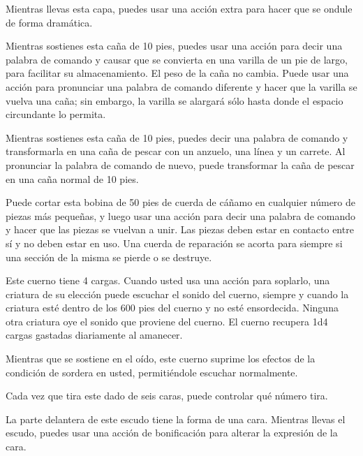 \documentclass[a4paper,twocolumn,openany,10pt]{dndbook}
\begin{document}
Mientras llevas esta capa, puedes usar una acción extra para hacer que se ondule de forma dramática.

Mientras sostienes esta caña de 10 pies, puedes usar una acción para decir una palabra de comando y causar que se convierta en
una varilla de un pie de largo, para facilitar su almacenamiento. El peso de la caña no cambia. Puede usar una acción para
pronunciar una palabra de comando diferente y hacer que la varilla se vuelva una caña; sin embargo, la varilla se alargará sólo
hasta donde el espacio circundante lo permita. 

Mientras sostienes esta caña de 10 pies, puedes decir una palabra de comando y transformarla en una caña de pescar con un
anzuelo, una línea y un carrete. Al pronunciar la palabra de comando de nuevo, puede transformar la caña de pescar en una caña
normal de 10 pies.

Puede cortar esta bobina de 50 pies de cuerda de cáñamo en cualquier número de piezas más pequeñas, y luego usar una acción para
decir una palabra de comando y hacer que las piezas se vuelvan a unir. Las piezas deben estar en contacto entre sí y no deben
estar en uso. Una cuerda de reparación se acorta para siempre si una sección de la misma se pierde o se destruye.

Este cuerno tiene 4 cargas. Cuando usted usa una acción para soplarlo, una criatura de su elección puede escuchar el sonido del
cuerno, siempre y cuando la criatura esté dentro de los 600 pies del cuerno y no esté ensordecida. Ninguna otra criatura oye el
sonido que proviene del cuerno. El cuerno recupera 1d4 cargas gastadas diariamente al amanecer.

Mientras que se sostiene en el oído, este cuerno suprime los efectos de la condición de sordera en usted, permitiéndole escuchar
normalmente.

Cada vez que tira este dado de seis caras, puede controlar qué número tira. 

La parte delantera de este escudo tiene la forma de una cara. Mientras llevas el escudo, puedes usar una acción de bonificación
para alterar la expresión de la cara.
\end{document}
